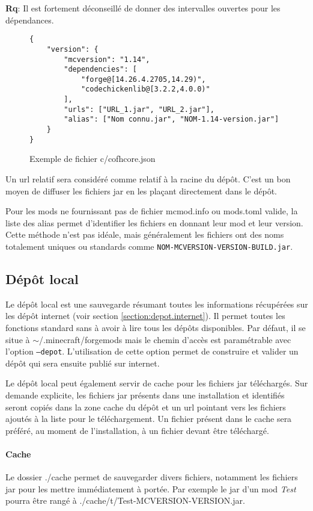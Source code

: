 \documentclass{article}
\newcommand{\remarque}[0]{\par\noindent\textbf{Rq}: }
\begin{document}
\remarque Il est fortement déconseillé de donner des intervalles ouvertes pour les dépendances.

\begin{figure}[h]
\begin{verbatim}
{
    "version": {
        "mcversion": "1.14",
        "dependencies": [
            "forge@[14.26.4.2705,14.29)",
            "codechickenlib@[3.2.2,4.0.0)"
        ],
        "urls": ["URL_1.jar", "URL_2.jar"],
        "alias": ["Nom connu.jar", "NOM-1.14-version.jar"]
    }
}
\end{verbatim}
\caption{Exemple de fichier \textsf{c/cofhcore.json}}
\label{fig:cofhcore.json}
\end{figure}

Un url relatif sera considéré comme relatif à la racine du dépôt.
C'est un bon moyen de diffuser les fichiers jar en les plaçant directement dans le dépôt.

Pour les mods ne fournissant pas de fichier \textsf{mcmod.info} ou \textsf{mods.toml} valide, la liste des alias permet d'identifier les fichiers en donnant leur mod et leur version.
Cette méthode n'est pas idéale, mais généralement les fichiers ont des noms totalement uniques ou standards comme \verb|NOM-MCVERSION-VERSION-BUILD.jar|.

\subsection{Dépôt local}
\label{section:depot.local}
Le dépôt local est une sauvegarde résumant toutes les informations récupérées sur les dépôt internet (voir section \ref{section:depot.internet}).
Il permet toutes les fonctions standard sans à avoir à lire tous les dépôts disponibles.
Par défaut, il se situe à \textsf{$\sim$/.minecraft/forgemods} mais le chemin d'accès est paramétrable avec l'option \texttt{--depot}.
L'utilisation de cette option permet de construire et valider un dépôt qui sera ensuite publié sur internet.

Le dépôt local peut également servir de cache pour les fichiers jar téléchargés.
Sur demande explicite, les fichiers jar présents dans une installation et identifiés seront copiés dans la zone cache du dépôt et un url pointant vers les fichiers ajoutés à la liste pour le téléchargement.
Un fichier présent dans le cache sera préféré, au moment de l'installation, à un fichier devant être téléchargé.

\paragraph{Cache}
Le dossier \textsf{./cache} permet de sauvegarder divers fichiers, notamment les fichiers jar pour les mettre immédiatement à portée.
Par exemple le jar d'un mod \textit{Test} pourra être rangé à \textsf{./cache/t/Test-MCVERSION-VERSION.jar}.
\end{document}
